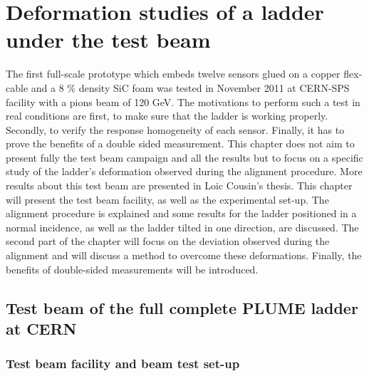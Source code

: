 \chapter{Deformation studies of a ladder under the test beam}
\label{chap:deformation}

  The first full-scale prototype which embeds twelve sensors glued on a copper flex-cable and a 8 \% density \gls{SiC} foam was tested in November 2011 at CERN-SPS facility with a pions beam of 120 GeV.
  The motivations to perform such a test in real conditions are first, to make sure that the ladder is working properly.
  Secondly, to verify the response homogeneity of each sensor.
  Finally, it has to prove the benefits of a double sided measurement.
  This chapter does not aim to present fully the test beam campaign and all the results but to focus on a specific study of the ladder's deformation observed during the alignment procedure.
  More results about this test beam are presented in Loic Cousin's thesis\cite{cousin}.
  This chapter will present the test beam facility, as well as the experimental set-up.
  The alignment procedure is explained and some results for the ladder positioned in a normal incidence, as well as the ladder tilted in one direction, are discussed.
  The second part of the chapter will focus on the deviation observed during the alignment and will discuss a method to overcome these deformations.
  Finally, the benefits of double-sided measurements will be introduced.
  
  \minitoc

  \section{Test beam of the full complete PLUME ladder at CERN}

    \subsection{Test beam facility and beam test set-up}

